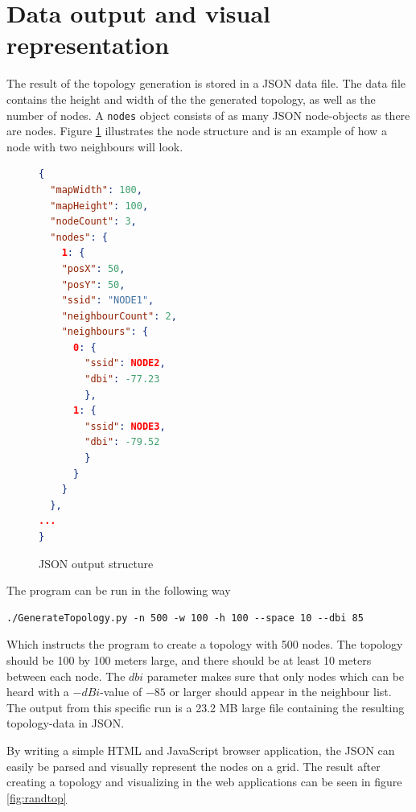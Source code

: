 \section{Data output and visual representation} \label{simulationrep}
The result of the topology generation is stored in a JSON\cite{JSON} data file.
The data file contains the height and width of the the generated topology, as well
as the number of nodes.
A \verb|nodes| object consists of as many JSON node-objects as there are nodes. Figure \ref{fig:nodeStruct} illustrates the node structure and is an example of how a node with two neighbours will look.
			\begin{figure}
			\begin{minipage}{\linewidth}
			\begin{lstlisting}[language=json]
{
  "mapWidth": 100,
  "mapHeight": 100,
  "nodeCount": 3,
  "nodes": {
    1: {
    "posX": 50,
    "posY": 50, 
    "ssid": "NODE1", 
    "neighbourCount": 2, 
    "neighbours": {
      0: {
        "ssid": NODE2,
        "dbi": -77.23
        },
      1: {
        "ssid": NODE3,
        "dbi": -79.52
        }
      }
    }
  },
...
}
\end{lstlisting}
\end{minipage}
\caption{JSON output structure}
\label{fig:nodeStruct}

\end{figure}
The program can be run in the following way
\begin{verbatim}./GenerateTopology.py -n 500 -w 100 -h 100 --space 10 --dbi 85 \end{verbatim}
Which instructs the program to create a topology with 500 nodes. The topology should be 100 by 100 meters large, and there should be at least 10 meters
between each node. The $dbi$ parameter makes sure that only nodes which can be heard with a $-dBi$-value of $-85$ or larger should appear in the neighbour list. 
The output from this specific run is a 23.2 MB large file containing the resulting topology-data in JSON.

By writing a simple HTML and JavaScript browser application, the JSON can easily be parsed and visually represent the nodes on a grid.
The result after creating a topology and visualizing in the web applications can be seen in figure \ref{fig:randtop}

